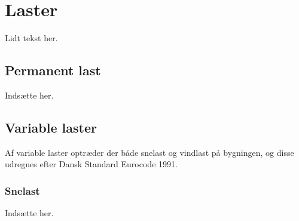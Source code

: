 \section{Laster}
Lidt tekst her.

\subsection{Permanent last}
Indsætte her.

\subsection{Variable laster}
Af variable laster optræder der både snelast og vindlast på bygningen, og disse udregnes efter Dansk Standard Eurocode 1991.

\subsubsection{Snelast}
Indsætte her.

